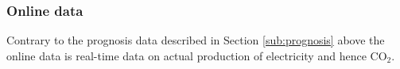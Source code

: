 \documentclass[Main]{subfiles}
\begin{document}

		\subsubsection{Online data} %
		\label{sub:online_data}
			Contrary to the prognosis data described in Section \ref{sub:prognosis} above the online data is real-time data on actual production of electricity and hence CO$_2$.


		



\end{document}
